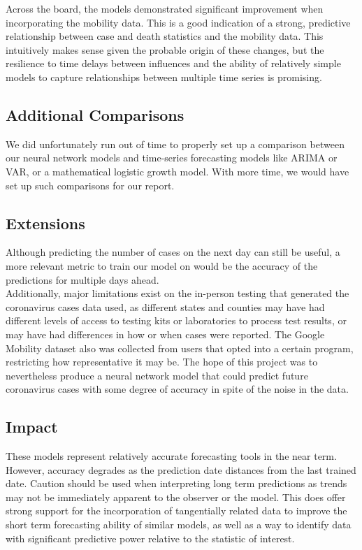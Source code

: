 ﻿\documentclass{article}
\begin{document}
\begin{multicols}{2}
Across the board, the models demonstrated significant improvement when
incorporating the mobility data.
This is a good indication of a strong, predictive relationship between case and
death statistics and the mobility data.
This intuitively makes sense given the probable origin of these changes,
but the resilience to time delays between influences and the ability of
relatively simple models to capture relationships between multiple time series
is promising. 

\subsection*{Additional Comparisons}

We did unfortunately run out of time to properly set up a comparison between our
neural network models and time-series forecasting models like ARIMA or VAR, or a
mathematical logistic growth model. With more time, we would have set up such
comparisons for our report.

\subsection*{Extensions}

Although predicting the number of cases on the next day can still be useful, a
more relevant metric to train our model on would be the accuracy of the
predictions for multiple days ahead.\\
Additionally, major limitations exist on the in-person testing that generated
the coronavirus cases data used, as different states and counties may have had
different levels of access to testing kits or laboratories to process test
results, or may have had differences in how or when cases were reported. The
Google Mobility dataset also was collected from users that opted into a certain
program, restricting how representative it may be. The hope of this project was
to nevertheless produce a neural network model that could predict future
coronavirus cases with some degree of accuracy in spite of the noise in the
data.

\subsection*{Impact}

These models represent relatively accurate forecasting tools in the near term.
However, accuracy degrades as the prediction date distances from the last
trained date.
Caution should be used when interpreting long term predictions as trends may not
be immediately apparent to the observer or the model.
This does offer strong support for the incorporation of tangentially related
data to improve the short term forecasting ability of similar models,
as well as a way to identify data with significant predictive power relative to
the statistic of interest.

\end{multicols}
\end{document}
